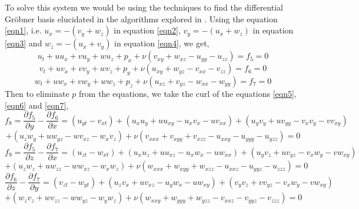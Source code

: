 \documentclass{article}
\begin{document}
To solve this system we would be using the techniques to find the differential Gr\"obner basis elucidated in the algorithms explored in \cite{groebnerbasis}. Using the equation \ref{eqn1}, i.e. $u_x = -(v_y + w_z)$ in equation \ref{eqn2}, $v_y = -(u_x + w_z)$ in equation \ref{eqn3} and $w_z = -(u_x + v_y)$ in equation \ref{eqn4}, we get,
\begin{equation} \label{eqn5}
u_t + u u_x + v u_y + w u_z + p_x + \nu (v_{xy} + w_{xz} - u_{yy} - u_{zz}) = f_5 = 0
\end{equation}
\begin{equation} \label{eqn6}
v_t + u v_x + v v_y + w v_z + p_y + \nu (u_{xy} + w_{yz} - v_{xx} - v_{zz}) = f_6 = 0
\end{equation}
\begin{equation} \label{eqn7}
w_t + u w_x + v w_y + w w_z + p_z + \nu (u_{xz} + v_{yz} - w_{xx} - w_{yy}) = f_7 = 0
\end{equation}
Then to eliminate $p$ from the equations, we take the curl of the equations \ref{eqn5}, \ref{eqn6} and \ref{eqn7},
\begin{equation*}
f_8 = \frac{\partial f_5}{\partial y} - \frac{\partial f_6}{\partial x} = (u_{yt}-v_{xt})+(u_x u_y + u u_{xy} - u_x v_x - u v_{xx})+(u_y v_y + u v_{yy} - v_x v_y - v v_{xy}) 
\end{equation*}
\begin{equation}
+(u_z w_y + u w_{yz} - w v_{xz} - w_x v_z) + \nu (v_{xxx}+v_{xyy}+v_{xzz}-u_{xxy}-u_{yyy}-u_{yzz})= 0
\end{equation}
\begin{equation*}
f_9 = \frac{\partial f_5}{\partial z} - \frac{\partial f_7}{\partial x} = (u_{zt}-w_{xt})+(u_x u_z + u u_{xz} - u_x w_x - u w_{xx})+(u_y v_z + u v_{yz} - v_x w_y - v w_{xy}) 
\end{equation*}
\begin{equation}
+(u_z w_z + u w_{zz} - w w_{xz} - w_x w_z) + \nu (w_{xxx}+w_{xyy}+w_{xzz}-u_{xxz}-u_{yyz}-u_{zzz})= 0
\end{equation}
\begin{equation*}
\frac{\partial f_6}{\partial z} - \frac{\partial f_7}{\partial y} = (v_{zt}-w_{yt})+(u_z v_x + u v_{xz} - u_y w_x - u w_{xy})+(v_y v_z + v v_{yz} - v_x w_y - v w_{xy}) 
\end{equation*}
\begin{equation} \label{eqn8}
+(w_z v_z + w v_{zz} - w w_{yz} - w_y w_z) + \nu (w_{xxy}+w_{yyy}+w_{yzz}-v_{xxz}-v_{yyz}-v_{zzz})= 0 
\end{equation}
\end{document}
